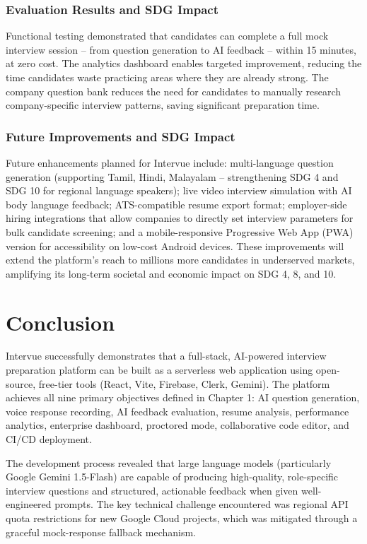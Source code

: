 \subsection{Evaluation Results and SDG Impact}
Functional testing demonstrated that candidates can complete a full mock interview session --
from question generation to AI feedback -- within 15 minutes, at zero cost. The analytics
dashboard enables targeted improvement, reducing the time candidates waste practicing areas
where they are already strong. The company question bank reduces the need for candidates
to manually research company-specific interview patterns, saving significant preparation time.

\subsection{Future Improvements and SDG Impact}
Future enhancements planned for Intervue include: multi-language question generation (supporting Tamil, Hindi, Malayalam -- strengthening SDG 4 and SDG 10 for regional language speakers); live video interview simulation with AI body language feedback; ATS-compatible resume export format; employer-side hiring integrations that allow companies to directly set interview parameters for bulk candidate screening; and a mobile-responsive Progressive Web App (PWA) version for accessibility on low-cost Android devices. These improvements will extend the platform's reach to millions more candidates in underserved markets, amplifying its long-term societal and economic impact on SDG 4, 8, and 10.

\chapter{Conclusion}
Intervue successfully demonstrates that a full-stack, AI-powered interview preparation platform
can be built as a serverless web application using open-source, free-tier tools (React,
Vite, Firebase, Clerk, Gemini). The platform achieves all nine primary objectives defined in
Chapter 1: AI question generation, voice response recording, AI feedback evaluation, resume
analysis, performance analytics, enterprise dashboard, proctored mode, collaborative code editor,
and CI/CD deployment.

The development process revealed that large language models (particularly Google Gemini 1.5-Flash)
are capable of producing high-quality, role-specific interview questions and structured, actionable
feedback when given well-engineered prompts. The key technical challenge encountered was regional
API quota restrictions for new Google Cloud projects, which was mitigated through a graceful
mock-response fallback mechanism.

